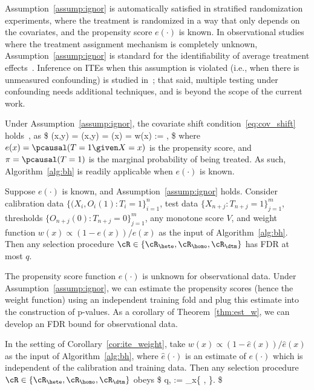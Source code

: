 Assumption~\ref{assump:ignor} is automatically satisfied in
stratified randomization experiments, where the treatment is randomized
in a way that only depends on the covariates, and
the propensity score $e(\cdot)$ is known.
In observational studies where the treatment assignment mechanism is completely unknown,
Assumption~\ref{assump:ignor} is standard
for the identifiability of average treatment effects~\cite{rosenbaum2002observational}.
Inference on ITEs when this assumption is violated (i.e., when
there is unmeasured confounding)
is studied in~\cite{jin2023sensitivity}; that said,
multiple testing under confounding needs additional techniques,
and is beyond the scope of
the current work.

Under Assumption~\ref{assump:ignor},
the covariate shift condition~\eqref{eq:cov_shift} holds~\cite{lei2021conformal}, as
\$
(x,y) = (x,y) = (x) = w(x) := ,
\$
where $e(x)=\pcausal(T=1\given X=x)$ is the propensity score, and $\pi=\pcausal(T=1)$ is the
marginal probability of being treated.
As such, Algorithm~\ref{alg:bh} is readily applicable when $e(\cdot)$ is known.

\begin{corollary}\label{cor:ite_weight}
Suppose $e(\cdot)$ is known, and Assumption~\ref{assump:ignor} holds.
Consider calibration data $\{(X_i,O_i(1)\colon T_i=1\}_{i=1}^n$,
test data $\{X_{n+j}\colon T_{n+j}=1\}_{j=1}^m$,
thresholds $\{O_{n+j}(0)\colon T_{n+j}=0\}_{j=1}^m$,
any monotone score $V$,
and weight function $w(x) \propto (1-e(x))/{e(x)}$ as the input
of Algorithm~\ref{alg:bh}.
Then any selection procedure $\cR \in \{\cR_{\hete}, \cR_{\homo}, \cR_{\dtm}\}$ has FDR at most $q$.
\end{corollary}

The propensity score function $e(\cdot)$ is unknown for observational
data. Under Assumption~\ref{assump:ignor},
we can estimate the propensity scores (hence the weight function)
using an independent training fold
and plug this estimate into the construction of p-values.
As a corollary of Theorem~\ref{thm:est_w}, we can develop an
FDR bound for observational data.

\begin{corollary}
    In the setting of Corollary~\ref{cor:ite_weight}, take
$w(x) \propto (1-\hat e(x))/{\hat e(x)}$ as the input
of Algorithm~\ref{alg:bh}, where
$\hat{e}(\cdot)$ is an estimate of $e(\cdot)$ which is independent of
the calibration and training data. Then any selection procedure $\cR \in \{\cR_{\hete}, \cR_{\homo}, \cR_{\dtm}\}$ obeys
\$
\fdr \leq  q\cdot \EE{},
\qquad
\hat\gamma := \sup_{x\in\cX}\max\bigg\{ ,
  \bigg\}.
\$
\end{corollary}

